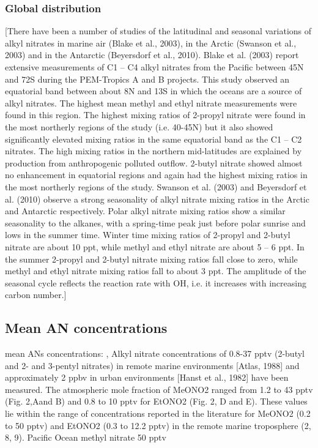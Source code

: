 \documentclass[11pt,a4paper]{article}
\begin{document}
\subsubsection*{Global distribution}
\citep{Newland2013}
[There have been a number of studies of the latitudinal and seasonal variations of alkyl nitrates in marine air (Blake et al., 2003), in the Arctic (Swanson et al., 2003) and in the Antarctic (Beyersdorf et al., 2010).
Blake et al. (2003) report extensive measurements of C1 – C4 alkyl nitrates from the Pacific between 45N and 72S during the PEM-Tropics A and B projects. This study observed an equatorial band between about 8N and 13S in which the oceans are a source of alkyl nitrates. The highest mean methyl and ethyl nitrate measurements were found in this region. The highest mixing ratios of 2-propyl nitrate were found in the most northerly regions of the study (i.e. 40-45N) but it also showed significantly elevated mixing ratios in the same equatorial band as the C1 – C2 nitrates. The high mixing ratios in the northern mid-latitudes are explained by production from anthropogenic polluted outflow. 2-butyl nitrate showed almost no enhancement in equatorial regions and again had the highest mixing ratios in the most northerly regions of the study.
Swanson et al. (2003) and Beyersdorf et al. (2010) observe a strong seasonality of alkyl nitrate mixing ratios in the Arctic and Antarctic respectively. Polar alkyl nitrate mixing ratios show a similar seasonality to the alkanes, with a spring-time peak just before polar sunrise and lows in the summer time. Winter time mixing ratios of 2-propyl and 2-butyl nitrate are about 10 ppt, while methyl and ethyl nitrate are about 5 – 6 ppt. In the summer 2-propyl and 2-butyl nitrate mixing ratios fall close to zero, while methyl and ethyl nitrate mixing ratios fall to about 3 ppt. The amplitude of the seasonal cycle reflects the reaction rate with OH, i.e. it increases with increasing carbon number.]

\subsection{Mean AN concentrations}
mean ANs concentrations: \citep{Reeves2007}, \citep{Roberts1998}
\citep{Atherton1989}
Alkyl nitrate concentrations of 0.8-37 pptv (2-butyl and 2- and 3-pentyl nitrates) in remote marine environments [Atlas, 1988] and approximately 2 ppbv in urban environments [Hanst et al., 1982] have been measured.
\citep{Chuck2002}
The atmospheric mole fraction of MeONO2 ranged from 1.2 to 43 pptv (Fig. 2,Aand B) and 0.8 to 10 pptv for EtONO2 (Fig. 2, D and E). These values lie within the range of concentrations reported in the literature for MeONO2 (0.2 to 50 pptv) and EtONO2 (0.3 to 12.2 pptv) in the remote marine troposphere (2, 8, 9).
\citep{Blake2003}
Pacific Ocean methyl nitrate 50 pptv
\end{document}
